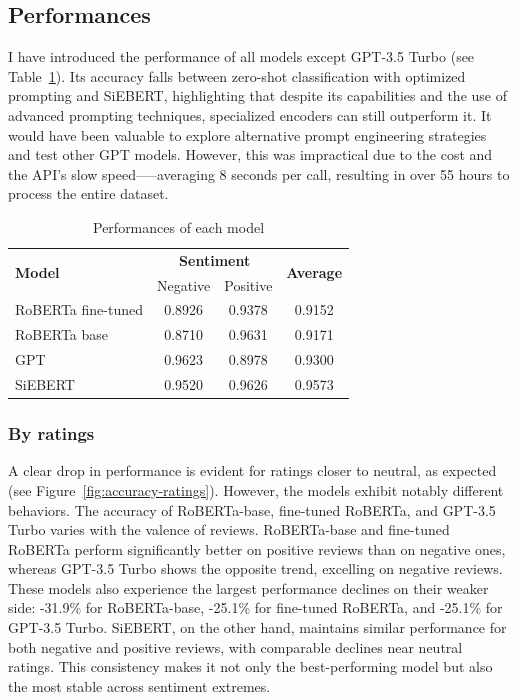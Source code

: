 \documentclass{article}
\begin{document}
\subsection{Performances}

I have introduced the performance of all models except GPT-3.5 Turbo (see Table~\ref{tab:perfs_by_sentiment}). Its accuracy falls between zero-shot classification with optimized prompting and SiEBERT, highlighting that despite its capabilities and the use of advanced prompting techniques, specialized encoders can still outperform it. It would have been valuable to explore alternative prompt engineering strategies and test other GPT models. However, this was impractical due to the cost and the API's slow speed--—averaging 8 seconds per call, resulting in over 55 hours to process the entire dataset.


\begin{table}
  \caption{Performances of each model}
  \label{tab:perfs_by_sentiment}
  \centering
  \begin{tabular}{lccc}
    \toprule
    \multirow{2}{*}{\centering \textbf{Model}} & \multicolumn{2}{c}{\textbf{Sentiment}} & \multirow{2}{*}{\centering \textbf{Average}} \\
    \cmidrule{2-3}
    & Negative & Positive \\
    \midrule
    RoBERTa fine-tuned & 0.8926 & 0.9378 & 0.9152 \\
    RoBERTa base & 0.8710 & 0.9631 & 0.9171 \\
    GPT & 0.9623 & 0.8978 & 0.9300 \\
    SiEBERT & 0.9520 & 0.9626 & 0.9573 \\
    \bottomrule
  \end{tabular}
\end{table}

\subsubsection{By ratings}

A clear drop in performance is evident for ratings closer to neutral, as expected (see Figure~\ref{fig:accuracy-ratings}). However, the models exhibit notably different behaviors. The accuracy of RoBERTa-base, fine-tuned RoBERTa, and GPT-3.5 Turbo varies with the valence of reviews. RoBERTa-base and fine-tuned RoBERTa perform significantly better on positive reviews than on negative ones, whereas GPT-3.5 Turbo shows the opposite trend, excelling on negative reviews. These models also experience the largest performance declines on their weaker side: -31.9\% for RoBERTa-base, -25.1\% for fine-tuned RoBERTa, and -25.1\% for GPT-3.5 Turbo. SiEBERT, on the other hand, maintains similar performance for both negative and positive reviews, with comparable declines near neutral ratings. This consistency makes it not only the best-performing model but also the most stable across sentiment extremes.
\end{document}

